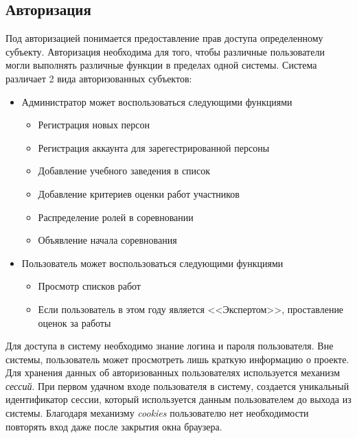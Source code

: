 \subsection{Авторизация}
Под авторизацией понимается предоставление прав доступа определенному субъекту.
Авторизация необходима для того, чтобы различные пользователи могли выполнять различные
функции в пределах одной системы.
\newpar
Система различает 2 вида авторизованных субъектов:
\begin{itemize}
    \item Администратор может воспользоваться следующими функциями
        \begin{itemize}
            \item Регистрация новых персон
            \item Регистрация аккаунта для зарегестрированной персоны
            \item Добавление учебного заведения в список
            \item Добавление критериев оценки работ участников
            \item Распределение ролей в соревновании
            \item Объявление начала соревнования
        \end{itemize}
    \item Пользователь может воспользоваться следующими функциями
        \begin{itemize}
            \item Просмотр списков работ
            \item Если пользователь в этом году является <<Экспертом>>,
                проставление оценок за работы
        \end{itemize}
\end{itemize}

Для доступа в систему необходимо знание логина и пароля пользователя.
Вне системы, пользователь может просмотреть лишь краткую информацию о проекте.
\newpar
Для хранения данных об авторизованных пользователях используется механизм \textit{сессий}.
При первом удачном входе пользователя в систему, создается уникальный идентификатор
сессии, который используется данным пользователем до выхода из системы. Благодаря
механизму \textit{cookies} пользователю нет необходимости повторять вход даже после
закрытия окна браузера.
